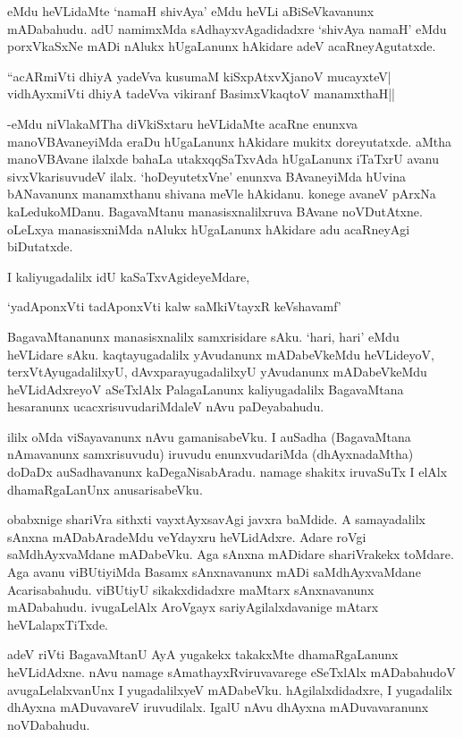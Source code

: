 eMdu heVLidaMte `namaH shivAya' eMdu heVLi aBiSeVkavanunx mADabahudu. adU namimxMda sAdhayxvAgadidadxre `shivAya namaH' eMdu porxVkaSxNe mADi nAlukx hUgaLanunx hAkidare adeV acaRneyAgutatxde.

\begin{shloka}
``acARmiVti dhiyA yadeVva kusumaM kiSxpAtxvXjanoV mucayxteV|\\
vidhAyxmiVti dhiyA tadeVva vikiranf BasimxVkaqtoV manamxthaH||
\end{shloka}

-eMdu niVlakaMTha diVkiSxtaru heVLidaMte acaRne enunxva manoVBAvaneyiMda eraDu hUgaLanunx hAkidare mukitx doreyutatxde. aMtha manoVBAvane ilalxde bahaLa utakxqqSaTxvAda hUgaLanunx iTaTxrU avanu sivxVkarisuvudeV ilalx. `hoDeyutetxVne' enunxva BAvaneyiMda hUvina bANavanunx manamxthanu shivana meVle hAkidanu. konege avaneV pArxNa kaLedukoMDanu. BagavaMtanu manasisxnalilxruva BAvane noVDutAtxne. oLeLxya manasisxniMda nAlukx hUgaLanunx hAkidare adu acaRneyAgi biDutatxde.

I kaliyugadalilx idU kaSaTxvAgideyeMdare,

\begin{shloka}
`yadAponxVti tadAponxVti kalw saMkiVtayxR keVshavamf'
\end{shloka}

BagavaMtananunx manasisxnalilx samxrisidare sAku. `hari, hari' eMdu heVLidare sAku. kaqtayugadalilx yAvudanunx mADabeVkeMdu heVLideyoV, terxVtAyugadalilxyU,  dAvxparayugadalilxyU yAvudanunx mADabeVkeMdu heVLidAdxreyoV aSeTxlAlx PalagaLanunx kaliyugadalilx BagavaMtana hesaranunx ucacxrisuvudariMdaleV nAvu paDeyabahudu.

ililx oMda viSayavanunx nAvu gamanisabeVku. I auSadha (BagavaMtana nAmavanunx samxrisuvudu) iruvudu enunxvudariMda (dhAyxnadaMtha) doDaDx auSadhavanunx kaDegaNisabAradu. namage shakitx iruvaSuTx I elAlx dhamaRgaLanUnx anusarisabeVku.

obabxnige shariVra sithxti vayxtAyxsavAgi javxra baMdide. A samayadalilx sAnxna mADabAradeMdu veYdayxru heVLidAdxre. Adare roVgi saMdhAyxvaMdane mADabeVku. Aga sAnxna mADidare shariVrakekx toMdare. Aga avanu viBUtiyiMda Basamx sAnxnavanunx mADi saMdhAyxvaMdane Acarisabahudu. viBUtiyU sikakxdidadxre maMtarx sAnxnavanunx mADabahudu. ivugaLelAlx AroVgayx sariyAgilalxdavanige mAtarx heVLalapxTiTxde.

adeV riVti BagavaMtanU AyA yugakekx takakxMte dhamaRgaLanunx heVLidAdxne. nAvu namage sAmathayxRviruvavarege eSeTxlAlx mADabahudoV avugaLelalxvanUnx I yugadalilxyeV mADabeVku. hAgilalxdidadxre, I yugadalilx dhAyxna mADuvavareV iruvudilalx. IgalU nAvu dhAyxna mADuvavaranunx noVDabahudu.


